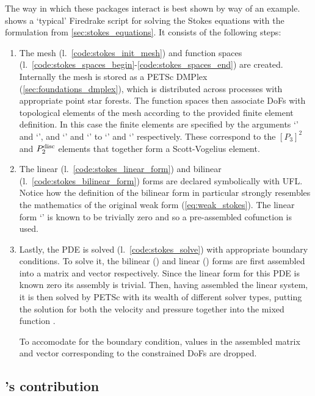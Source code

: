 \documentclass[thesis]{subfiles}
\begin{document}
The way in which these packages interact is best shown by way of an example.
 shows a `typical' Firedrake script for solving the Stokes equations with the formulation from \cref{sec:stokes_equations}.
It consists of the following steps:
\begin{enumerate}
  \item
    The mesh (l.~\ref{code:stokes_init_mesh}) and function spaces (l.~\ref{code:stokes_spaces_begin}-\ref{code:stokes_spaces_end}) are created.
    Internally the mesh is stored as a PETSc DMPlex (\cref{sec:foundations_dmplex}), which is distributed across processes with appropriate point star forests.
    The function spaces then associate DoFs with topological elements of the mesh according to the provided finite element definition.
    In this case the finite elements are specified by the arguments `' and `', and `' and `' to `' and `' respectively.
    These correspond to the $[P_3]^2$ and $P_2^{\textnormal{disc}}$ elements that together form a Scott-Vogelius element.

  \item
    The linear (l.~\ref{code:stokes_linear_form}) and bilinear (l.~\ref{code:stokes_bilinear_form}) forms are declared symbolically with UFL.
    Notice how the definition of the bilinear form in particular strongly resembles the mathematics of the original weak form (\cref{eq:weak_stokes}).
    The linear form `' is known to be trivially zero and so a pre-assembled cofunction is used.

  \item
    Lastly, the PDE is solved (l.~\ref{code:stokes_solve}) with appropriate boundary conditions.
    To solve it, the bilinear () and linear () forms are first assembled into a matrix and vector respectively.
    Since the linear form for this PDE is known zero its assembly is trivial.
    Then, having assembled the linear system, it is then solved by PETSc with its wealth of different solver types, putting the solution for both the velocity and pressure together into the mixed function .

    To accomodate for the boundary condition, values in the assembled matrix and vector corresponding to the constrained DoFs are dropped.
\end{enumerate}

\subsection{'s contribution}
\end{document}
